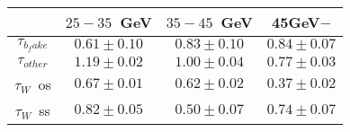 \centering
\begin{tabular}{|c|c|c|c|} \hline
 & $25-35$~GeV & $35-45$~GeV & 45GeV$-$\\\hline
$\tau_{b_fake}$ & $0.61\pm0.10$ & $0.83\pm0.10$ & $0.84\pm0.07$\\\hline
$\tau_{other}$ & $1.19\pm0.02$ & $1.00\pm0.04$ & $0.77\pm0.03$\\\hline
$\tau_{W}$~os & $0.67\pm0.01$ & $0.62\pm0.02$ & $0.37\pm0.02$\\\hline
$\tau_{W}$~ss & $0.82\pm0.05$ & $0.50\pm0.07$ & $0.74\pm0.07$\\\hline
\end{tabular}
